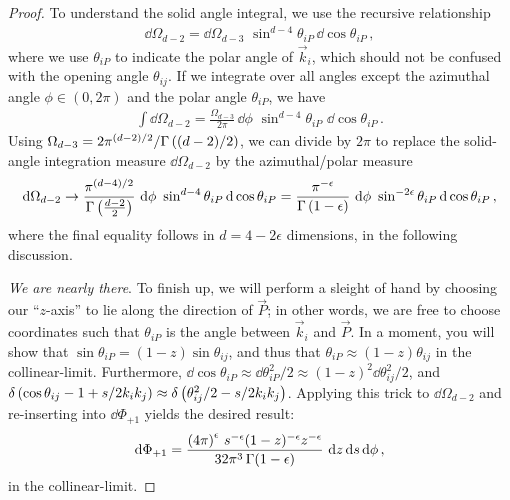 \begin{proof}
    To understand the solid angle integral, we use the recursive relationship
    \begin{align}
        \dd \Omega_{d-2}
        =
        \dd \Omega_{d-3}
        \,\,
        \sin^{d-4}\theta_{iP} \, \dd \cos \theta_{iP}
        \,,
    \end{align}
    where we use \(\theta_{iP}\) to indicate the polar angle of \(\vec{k}_i\), which should not be confused with the opening angle \(\theta_{ij}\).
    If we integrate over all angles except the azimuthal angle \(\phi \in (0, 2\pi)\) and the polar angle \(\theta_{iP}\), we have
    \begin{align}
        \int
        \dd \Omega_{d-2}
        =
        \frac{\Omega_{d-3}}{2\pi}
        \,
        \dd \phi
        \,\,
        \sin^{d-4}\theta_{iP}
        \,\,
        \dd\cos\theta_{iP}
        \,.
    \end{align}
    Using \(\Omega_{d-3} = 2 \pi^{(d-2)/2} / \Gamma\left((d-2)/2\right)\), we can divide by \(2 \pi\) to replace the solid-angle integration measure \(\dd \Omega_{d-2}\) by the azimuthal/polar measure
    \begin{align}
        \dd \Omega_{d-2}
        \to
        \frac{\pi^{(d-4)/2}}{\Gamma\left(\frac{d-2}{2}\right)}
        \,\,
        \dd\phi
        \,\,
        \sin^{d-4}\theta_{iP}
        \,
        \dd \cos\theta_{iP}
        =
        \frac{\pi^{-\epsilon}}{\Gamma\left(1 - \epsilon\right)}
        \,\,
        \dd\phi
        \,\,
        \sin^{-2\epsilon}\theta_{iP}
        \,
        \dd \cos\theta_{iP}
        \,,
    \end{align}
    where the final equality follows in \(d = 4-2\epsilon\) dimensions, in the following discussion.


    \textit{We are nearly there}.
    To finish up, we will perform a sleight of hand by choosing our ``\(z\)-axis'' to lie along the direction of \(\vec{P}\);
    in other words, we are free to choose coordinates such that \(\theta_{iP}\) is the angle between \(\vec{k}_i\) and \(\vec{P}\).
    In a moment, you will show that \(\sin\theta_{iP} = (1-z) \sin\theta_{ij}\), and thus that \(\theta_{iP} \approx (1-z) \theta_{ij}\) in the \gls{collinear-limit}.
    Furthermore, \(\dd \cos\theta_{iP} \approx \dd \theta_{iP}^2 / 2 \approx (1-z)^2 \dd \theta_{ij}^2 / 2\), and \(\delta\left(\cos\theta_{ij} - 1 + s / 2 k_i k_j\right) \approx \delta\left(\theta_{ij}^2/2 - s / 2 k_i k_j\right)\).
    Applying this trick to \(\dd \Omega_{d-2}\) and re-inserting into \(\dd \Phi_{+1}\) yields the desired result:
    \begin{align}
        \dd \Phi_{+1}
        =
        \frac{\left(4 \pi\right)^\epsilon
            \,
            s^{-\epsilon} (1-z)^{-\epsilon} z^{-\epsilon}}
        {32 \pi^3\, \Gamma(1-\epsilon)}
        \,\,
        \dd z \, \dd s \, \dd \phi
        \,,
    \end{align}
    in the \gls{collinear-limit}.
\end{proof}


